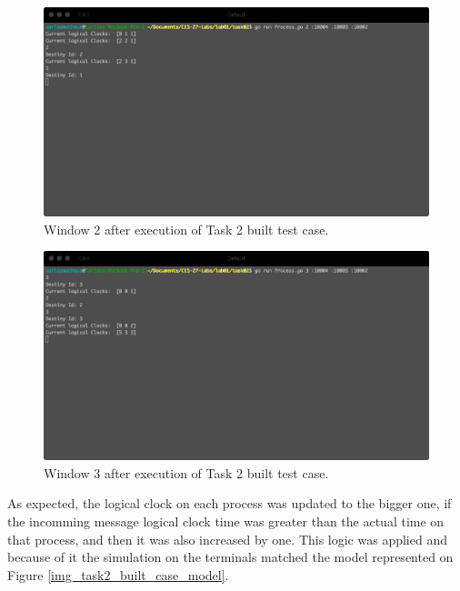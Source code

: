 \documentclass[a4paper, 11pt]{article}
\begin{document}
\begin{figure}[h]
  \begin{center}
  \includegraphics[width=4.5in]{./imgs/task2_buit_test_window2.png}
  \caption{Window 2 after execution of Task 2 built test case.}
  \label{img_task2_built_case_window2}
  \end{center}
\end{figure}

\begin{figure}[h]
  \begin{center}
  \includegraphics[width=4.5in]{./imgs/task2_buit_test_window3.png}
  \caption{Window 3 after execution of Task 2 built test case.}
  \label{img_task2_built_case_window3}
  \end{center}
\end{figure}

As expected, the logical clock on each process was updated to the bigger one, if the incomming message logical clock time was greater than the actual time on that process, and then it was also increased by one. This logic was applied and because of it the simulation on the terminals matched the model represented on Figure \ref{img_task2_built_case_model}.

% 
% 
\end{document}
